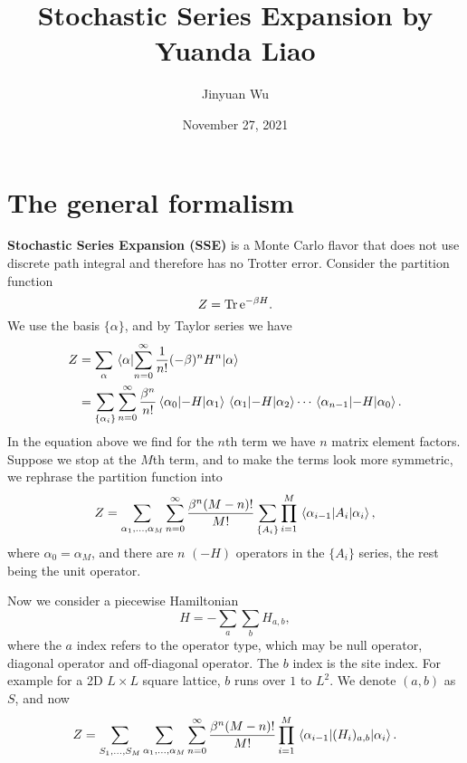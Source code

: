 \documentclass[hyperref, a4paper]{article}
\title{Stochastic Series Expansion by Yuanda Liao}
\author{Jinyuan Wu}
\date{November 27, 2021}
\newcommand*{\ee}{\mathrm{e}}
\newcommand*{\concept}[1]{{\textbf{#1}}}
\begin{document}
\maketitle

\section{The general formalism}

\concept{Stochastic Series Expansion (SSE)} is a Monte Carlo flavor that does not use discrete path integral
and therefore has no Trotter error.
Consider the partition function 
\[
    Z = \Trace \ee^{- \beta H}.
\]
We use the basis $\{\alpha\}$, and by Taylor series we have 
\[
    \begin{aligned}
        Z &= \sum_{\alpha} \expval{\sum_{n=0}^\infty \frac{1}{n!} (-\beta)^n H^n}{\alpha} \\
        &= \sum_{\{\alpha_i\}} \sum_{n=0}^\infty \frac{\beta^n}{n!} 
        \mel{\alpha_0}{-H}{\alpha_1} \mel{\alpha_1}{-H}{\alpha_2} \cdots \mel{\alpha_{n-1}}{-H}{\alpha_0}.
    \end{aligned}
\]
In the equation above we find for the $n$th term we have $n$ matrix element factors. 
Suppose we stop at the $M$th term, and to make the terms look more symmetric, we rephrase the partition 
function into 
\begin{equation}
    Z = \sum_{\alpha_1, \ldots, \alpha_M} \sum_{n=0}^\infty \frac{\beta^n (M-n)!}{M!} 
    \sum_{\{A_i\}} \prod_{i=1}^M \mel{\alpha_{i-1}}{A_i}{\alpha_i}, 
    \label{eq:partition-1}
\end{equation}
where $\alpha_0 = \alpha_M$, and there are $n$ $(-H)$ operators in the $\{A_i\}$ series, 
the rest being the unit operator. 

Now we consider a piecewise Hamiltonian 
\begin{equation}
    H = - \sum_a \sum_b H_{a, b},
\end{equation}
where the $a$ index refers to the operator type, which may be null operator, diagonal operator and off-diagonal 
operator. The $b$ index is the site index. For example for a 2D $L \times L$ square lattice, $b$ runs over 
$1$ to $L^2$. We denote $(a, b)$ as $S$, and now 
\begin{equation}
    Z = \sum_{S_1, \ldots, S_M} \sum_{\alpha_1, \ldots, \alpha_M} 
    \sum_{n=0}^\infty \frac{\beta^n (M-n)!}{M!} \prod_{i=1}^M \mel{\alpha_{i-1}}{(H_{i})_{a, b}}{\alpha_i}.
    \label{eq:partition-2}
\end{equation}
\end{document}
